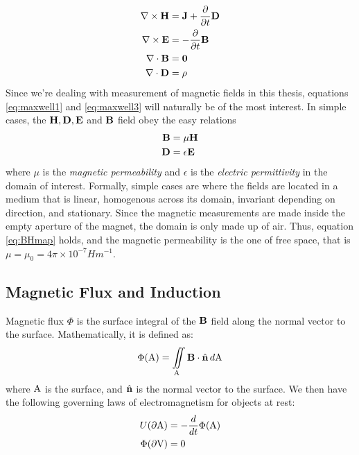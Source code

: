 \begin{align}
    \nabla \times \vb{H} & = \vb{J} + \frac{\partial}{\partial t}\vb{D}
    \label{eq:maxwell1}                                                 \\
    \nabla \times \vb{E} & = -\frac{\partial}{\partial t}\vb{B}
    \label{eq:maxwell2}                                                 \\
    \nabla \cdot \vb{B}  & = \vb{0}
    \label{eq:maxwell3}                                                 \\
    \nabla \cdot \vb{D}  & = \rho
    \label{eq:maxwell4}
\end{align}
Since we're dealing with measurement of magnetic fields in this thesis,
equations \ref{eq:maxwell1} and \ref{eq:maxwell3} will naturally be of
the most interest. In simple cases, the $\vb{H}, \vb{D}, \vb{E}$ and
$\vb{B}$ field obey the easy relations
\begin{align}
    \vb{B} & = \mu \vb{H}
    \label{eq:BHmap}           \\
    \vb{D} & = \epsilon \vb{E}
\end{align}
where $\mu$ is the \emph{magnetic permeability} and $\epsilon$ is the
\emph{electric permittivity} in the domain of interest.
Formally, simple cases are where the fields are located in a medium that is
linear, homogenous across its domain, invariant depending on direction, and
stationary. Since the magnetic measurements are made inside the empty aperture
of the magnet, the domain is only made up of air. Thus, equation \ref{eq:BHmap}
holds, and the magnetic permeability is the one of free space, that is
$\mu = \mu_0 = 4\pi \times 10^{-7} Hm^{-1}$. \cite[Ch.4.1-4.4]{russenschuck_field_2011}


\subsection{Magnetic Flux and Induction}
Magnetic flux $\Phi$ is the surface integral of the $\vb{B}$ field
along the normal vector to the surface.
Mathematically, it is defined as:
\begin{equation}
    \Phi(\mathrm{A}) = \iint\limits_{\mathrm{A}} \vb{B} \cdot \hat{\vb{n}}\, d\mathrm{A}
\end{equation}
where $\mathrm{A}$ is the surface, and $\hat{\vb{n}}$ is the normal vector to the surface.
We then have the following governing laws of electromagnetism for objects at rest:
\begin{align}
    U(\partial\mathrm{A})      & = -\frac{d}{dt}\Phi(\mathrm{A})
    \label{eq:faraday}                                 \\
    \Phi(\partial\mathrm{V}) & = 0
    \label{eq:fluxcons}
\end{align}

